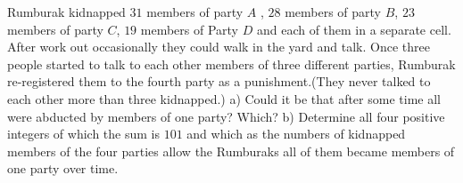 Rumburak kidnapped $31$ members of party $A$ , $28$ members of party $B$, $23$ members of party $C$, $19$ members of Party $D$ and each of them in a separate cell. After work out occasionally they could walk in the yard and talk. Once three people started to talk to each other members of three different parties, Rumburak re-registered them to the fourth party as a punishment.(They never talked to each other more than three kidnapped.)
a) Could it be that after some time all were abducted by members of one party? Which?
b) Determine all four positive integers of which the sum is $101$ and which as the numbers of kidnapped members of the four parties allow the Rumburaks all of them became members of one party over time.